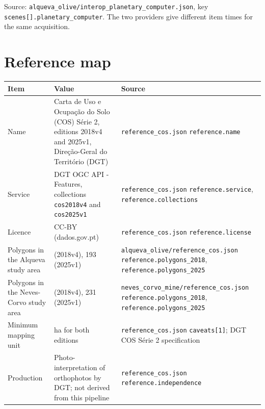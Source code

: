 Source: \texttt{alqueva\_olive/\allowbreak{}interop\_planetary\_computer.json}, key \texttt{scenes[].planetary\_computer}. The two providers give different item times for the same acquisition.

\section{Reference map}

{\small
\begin{longtable}{>{\raggedright\arraybackslash}p{3.32cm}>{\raggedright\arraybackslash}p{5.24cm}>{\raggedright\arraybackslash}p{5.24cm}}
\toprule
Item & Value & Source \\
\midrule
\endhead
Name & Carta de Uso e Ocupação do Solo (COS) Série 2, editions 2018v4 and 2025v1, Direção-Geral do Território (DGT) & \texttt{reference\_cos.json} \texttt{reference.name} \\
Service & DGT OGC API - Features, collections \texttt{cos2018v4} and \texttt{cos2025v1} & \texttt{reference\_cos.json} \texttt{reference.service}, \texttt{reference.collections} \\
Licence & CC-BY (dados.gov.pt) & \texttt{reference\_cos.json} \texttt{reference.license} \\
Polygons in the Alqueva study area & 183 (2018v4), 193 (2025v1) & \texttt{alqueva\_olive/\allowbreak{}reference\_cos.json} \texttt{reference.polygons\_2018}, \texttt{reference.polygons\_2025} \\
Polygons in the Neves-Corvo study area & 230 (2018v4), 231 (2025v1) & \texttt{neves\_corvo\_mine/\allowbreak{}reference\_cos.json} \texttt{reference.polygons\_2018}, \texttt{reference.polygons\_2025} \\
Minimum mapping unit & 0.5 ha for both editions & \texttt{reference\_cos.json} \texttt{caveats[1]}; DGT COS Série 2 specification \cite{R268} \\
Production & Photo-interpretation of orthophotos by DGT; not derived from this pipeline & \texttt{reference\_cos.json} \texttt{reference.independence} \\
\bottomrule
\end{longtable}
}
